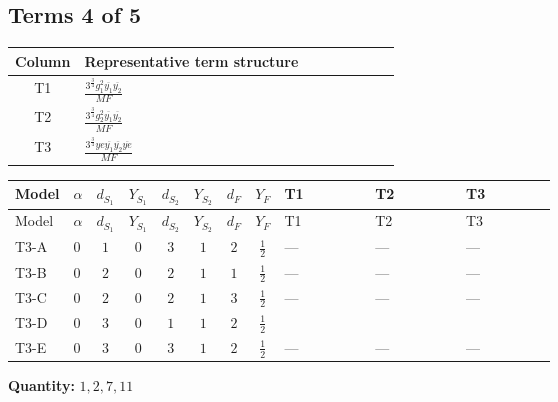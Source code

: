 \documentclass[8pt]{article}
\begin{document}
\begin{landscape}
\subsection*{Terms 4 of 5}
\begin{center}
\begin{tabular}{@{}c >{\raggedright\arraybackslash}p{0.82\linewidth}@{}}
\toprule
Column & Representative term structure \\
\midrule
T1 & \(\displaystyle \frac{3^{\frac{3}{4}} g_{1}^{2} \overline{y_{1}} \overline{y_{2}}}{MF}\) \\
\midrule
T2 & \(\displaystyle \frac{3^{\frac{3}{4}} g_{2}^{2} \overline{y_{1}} \overline{y_{2}}}{MF}\) \\
\midrule
T3 & \(\displaystyle \frac{3^{\frac{3}{4}} ye \overline{y_{1}} \overline{y_{2}} \overline{ye}}{MF}\) \\
\midrule
\bottomrule
\end{tabular}
\end{center}
\smallskip
\tiny
\begin{longtable}{@{}llcccccc >{\raggedright\arraybackslash}p{0.21\linewidth} >{\raggedright\arraybackslash}p{0.21\linewidth} >{\raggedright\arraybackslash}p{0.21\linewidth}@{}}
\toprule
Model & $\alpha$ & $d_{S_1}$ & $Y_{S_1}$ & $d_{S_2}$ & $Y_{S_2}$ & $d_F$ & $Y_F$ & T1 & T2 & T3 \\
\midrule
\endfirsthead
\toprule
Model & $\alpha$ & $d_{S_1}$ & $Y_{S_1}$ & $d_{S_2}$ & $Y_{S_2}$ & $d_F$ & $Y_F$ & T1 & T2 & T3 \\
\midrule
\endhead
T3-A & $0$ & $1$ & $0$ & $3$ & $1$ & $2$ & $\frac{1}{2}$ & --- & --- & --- \\
\midrule
T3-B & $0$ & $2$ & $0$ & $2$ & $1$ & $1$ & $\frac{1}{2}$ & --- & --- & --- \\
\midrule
T3-C & $0$ & $2$ & $0$ & $2$ & $1$ & $3$ & $\frac{1}{2}$ & --- & --- & --- \\
\midrule
T3-D & $0$ & $3$ & $0$ & $1$ & $1$ & $2$ & $\frac{1}{2}$ & \scriptsize\adjustbox{max width=\linewidth}{$\begin{gathered} \frac{3^{\frac{3}{4}} g_{1}^{2} \overline{y_{1}} \overline{y_{2}}}{8 MF}\end{gathered}$} & \scriptsize\adjustbox{max width=\linewidth}{$\begin{gathered} \frac{25 \cdot 3^{\frac{3}{4}} g_{2}^{2} \overline{y_{1}} \overline{y_{2}}}{24 MF}\end{gathered}$} & \scriptsize\adjustbox{max width=\linewidth}{$\begin{gathered} - \frac{3^{\frac{3}{4}} ye \overline{y_{1}} \overline{y_{2}} \overline{ye}}{12 MF}\end{gathered}$} \\
\midrule
T3-E & $0$ & $3$ & $0$ & $3$ & $1$ & $2$ & $\frac{1}{2}$ & --- & --- & --- \\
\midrule
\bottomrule
\end{longtable}
\clearpage
\noindent\textbf{Quantity: }$\mathrm{1,2,7,11}$\par\smallskip

\end{landscape}
\end{document}

